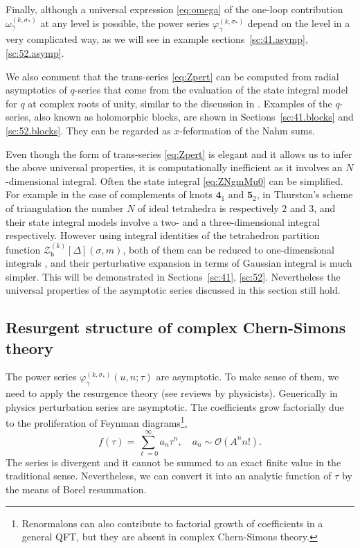 \documentclass[a4paper,11pt]{article}	%
\def\mc{\mathcal}
\def\md{\mathbf}
\def\ms{\mathsf}
\def\cO{\mathcal{O}}
\newcommand{\bb}{\ms{b}}
\newcommand{\s}{\sigma}
\newcommand{\knot}[1]{\md{#1}}
\begin{document}
Finally, although a universal expression \eqref{eq:omega} of the
one-loop contribution $\omega_\gamma^{(k,\s_*)}$ at any level is
possible, the power series $\varphi_\gamma^{(k,\s_*)}$ depend on the
level in a very complicated way, as we will see in example
sections~\ref{sc:41.asymp},\ref{sc:52.asymp}.

We also comment that the trans-series \eqref{eq:Zpert} can be computed
from radial asymptotics of $q$-series that come from the evaluation of
the state integral model for $q$ at complex roots of unity, similar to
the discussion in \cite{Garoufalidis:2018qds}.
%
Examples of the $q$-series, also known as holomorphic blocks, are
shown in Sections~\ref{sc:41.blocks} and \ref{sc:52.blocks}.
%
They can be regarded as $x$-feformation of the Nahm sums.

Even though the form of trans-series \eqref{eq:Zpert} is elegant and
it allows us to infer the above universal properties, it is
computationally inefficient as it involves an $N$-dimensional
integral.  Often the state integral \eqref{eq:ZNgmMu0} can be
simplified.
%
For example in the case of complements of knots $\knot{4}_1$ and
$\knot{5}_2$, in Thurston's scheme of triangulation the number $N$ of
ideal tetrahedra is respectively $2$ and $3$, and their state integral
models involve a two- and a three-dimensional integral respectively.
However using integral identities of the tetrahedron partition
function $\mc{Z}_\bb^{(k)}[\Delta](\sigma,m)$, both of them can be
reduced to one-dimensional integrals
\cite{Dimofte:2014zga,Andersen:2016ugz}, and their perturbative
expansion in terms of Gaussian integral is much simpler.  This will be
demonstrated in Sections~\ref{sc:41}, \ref{sc:52}.
%
Nevertheless the universal properties of the asymptotic series
discussed in this section still hold.






\subsection{Resurgent structure of complex Chern-Simons theory}

The power series $\varphi_{\gamma}^{(k,\s_*)}(u,n;\tau)$ are
asymptotic.  To make sense of them, we need to apply the resurgence
theory \cite{Ecalle,Mitschi:2016fxp} (see reviews
\cite{Marino:2012zq,Dorigoni:2014hea,Aniceto:2018bis} by physicists).
Generically in physics perturbation series are asymptotic.  The
coefficients grow factorially due to the proliferation of Feynman
diagrams\footnote{Renormalons can also contribute to factorial growth
  of coefficients in a general QFT, but they are absent in complex
  Chern-Simons theory.},
\begin{equation}
  f(\tau) = \sum_{\ell=0}^\infty a_n\tau^n,\quad a_n\sim \cO(A^nn!).
\end{equation}
The series is divergent and it cannot be summed to an exact finite
value in the traditional sense.  Nevertheless, we can convert it into
an analytic function of $\tau$ by the means of Borel resummation.
\end{document}
